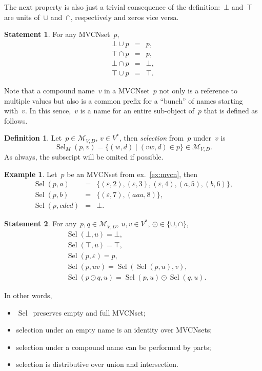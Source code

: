 \documentclass{article}
\theoremstyle{definition}
\newtheorem{Df}{Definition}
\newtheorem{St}{Statement}
\newtheorem{Ex}{Example}
\newcommand{\setcharmvcn}{M}
\newcommand{\setsymbol}[3]{\mathcal{#1}_{#2,#3}}
\newcommand{\setmvcn}[2]{\setsymbol{\setcharmvcn}{#1}{#2}}
\newcommand{\select}{\operatorname{Sel}}
\begin{document}
The next property is also just a trivial consequence of the definition:~$\bot$
and~$\top$ are units of~$\cup$ and~$\cap$, respectively and zeros vice versa.
\begin{St}\label{st:mvcn-neutrals}
For any MVCNset~$p$,
\begin{eqnarray*}
  \bot \cup p & = & p,    \\
  \top \cap p & = & p,    \\
  \bot \cap p & = & \bot, \\
  \top \cup p & = & \top.
\end{eqnarray*}
\end{St}

Note that a compound name~$v$ in a MVCNset~$p$ not only is a reference to
multiple values but also is a common prefix for a ``bunch'' of names starting
with~$v$. In this sence,~$v$ is a name for an entire sub-object of~$p$ that is
defined as follows.
\begin{Df}\label{df:mvcn-select}
Let~$p\in\setmvcn{V}{D}$, $v\in V^\ast$, then \emph{selection} from~$p$
under~$v$ is
\[
  \select_\setcharmvcn(p,v) = \{ (w, d) \mid (vw, d)\in p \} \in\setmvcn{V}{D}.
\]
As always, the subscript will be omited if possible.
\end{Df}

\begin{Ex}\label{ex:mvcn-select}
Let~$p$ be an MVCNset from ex.~\ref{ex:mvcn}, then
\begin{eqnarray*}
  \select(p, a) & = & \{
    (\varepsilon, 2),
    (\varepsilon, 3),
    (\varepsilon, 4),
    (a,           5),
    (b,           6)
  \} , \\
  \select(p, b) & = & \{
    (\varepsilon, 7),
    (aaa,         8)
  \} , \\
  \select(p, cdcd) & = & \bot .
\end{eqnarray*}
\end{Ex}

\begin{St}\label{st:mvcn-selection-properties}
For any~$p,q\in\setmvcn{V}{D}$, $u, v\in V^\ast$, $\odot\in\{\cup, \cap\}$,
\begin{eqnarray*}
  & \select(\bot,u) = \bot, \\
  & \select(\top,u) = \top, \\
  & \select(p,\varepsilon) = p, \\
  & \select(p,uv) = \select(\select(p,u), v), \\
  & \select(p\odot q, u) = \select(p,u)\odot \select(q,u).
\end{eqnarray*}
\end{St}
In other words,
\begin{itemize}
\item $\select$~preserves empty and full MVCNset;
\item selection under an empty name is an identity over MVCNsets;
\item selection under a compound name can be performed by parts;
\item selection is distributive over union and intersection.
\end{itemize}
\end{document}
